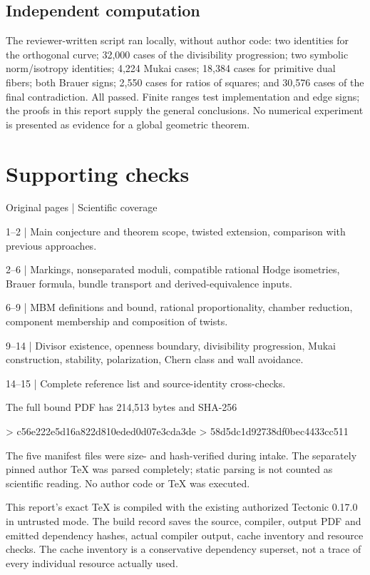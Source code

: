 \documentclass[10pt]{article}
\begin{document}
\subsection*{Independent computation}
The reviewer-written script ran locally, without author code: two identities for the orthogonal curve; 32,000 cases of the divisibility progression; two symbolic norm/isotropy identities; 4,224 Mukai cases; 18,384 cases for primitive dual fibers; both Brauer signs; 2,550 cases for ratios of squares; and 30,576 cases of the final contradiction. All passed. Finite ranges test implementation and edge signs; the proofs in this report supply the general conclusions. No numerical experiment is presented as evidence for a global geometric theorem.\par
\section*{Supporting checks}
Original pages | Scientific coverage\par
1–2 | Main conjecture and theorem scope, twisted extension, comparison with previous approaches.\par
2–6 | Markings, nonseparated moduli, compatible rational Hodge isometries, Brauer formula, bundle transport and derived-equivalence inputs.\par
6–9 | MBM definitions and bound, rational proportionality, chamber reduction, component membership and composition of twists.\par
9–14 | Divisor existence, openness boundary, divisibility progression, Mukai construction, stability, polarization, Chern class and wall avoidance.\par
14–15 | Complete reference list and source-identity cross-checks.\par
The full bound PDF has 214,513 bytes and SHA-256\par
> c56e222e5d16a822d810eded0d07e3cda3de
> 58d5dc1d92738df0bec4433cc511\par
The five manifest files were size- and hash-verified during intake. The separately pinned author TeX was parsed completely; static parsing is not counted as scientific reading. No author code or TeX was executed.\par
This report’s exact TeX is compiled with the existing authorized Tectonic 0.17.0 in untrusted mode. The build record saves the source, compiler, output PDF and emitted dependency hashes, actual compiler output, cache inventory and resource checks. The cache inventory is a conservative dependency superset, not a trace of every individual resource actually used.\par
\end{document}
